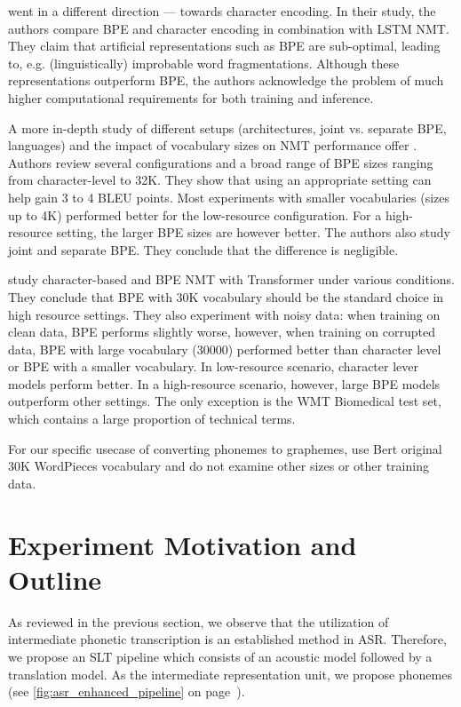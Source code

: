  went in a different direction --- towards character encoding. In their study, the authors compare BPE and character encoding in combination with LSTM NMT. They claim that artificial representations such as BPE are sub-optimal, leading to, e.g. (linguistically) improbable word fragmentations. Although these representations outperform BPE, the authors acknowledge the problem of much higher computational requirements for both training and inference.

A more in-depth study of different setups (architectures, joint vs. separate BPE, languages) and the impact of vocabulary sizes on NMT performance offer . Authors review several configurations and a broad range of BPE sizes ranging from character-level to 32K. They show that using an appropriate setting can help gain 3 to 4 BLEU points. Most experiments with smaller vocabularies (sizes up to 4K) performed better for the low-resource configuration. For a high-resource setting, the larger BPE sizes are however better. The authors also study joint and separate BPE. They conclude that the difference is negligible.


 study character-based and BPE NMT with Transformer under various conditions. They conclude that BPE with 30K vocabulary should be the standard choice in high resource settings. They also experiment with noisy data: when training on clean data, BPE performs slightly worse, however, when training on corrupted data, BPE with large vocabulary (30000) performed better than character level or BPE with a smaller vocabulary. In low-resource scenario, character lever models perform better. In a high-resource scenario, however, large BPE models outperform other settings. The only exception is the WMT Biomedical test set, which contains a large proportion of technical terms.

For our specific usecase of converting phonemes to graphemes,  use Bert  original 30K WordPieces vocabulary and do not examine other sizes or other training data.

\pagebreak
\section{Experiment Motivation and Outline}
\label{easr:eperiment}
As reviewed in the previous section, we observe that the utilization of intermediate phonetic transcription is an established method in ASR. Therefore, we propose an SLT pipeline which consists of an acoustic model followed by a translation model. As the intermediate representation unit, we propose phonemes (see \cref{fig:asr_enhanced_pipeline} on page~\pageref{fig:asr_enhanced_pipeline}). 

